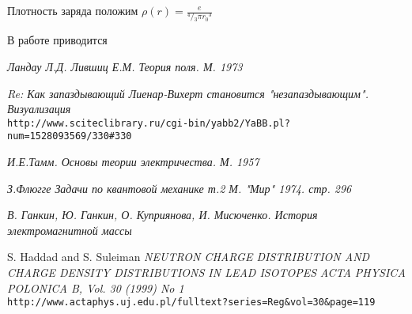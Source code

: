 \documentclass{article}
\begin{document}
Плотность заряда положим $\rho \left( r \right)=\frac{e}{{}^{4}/{}_{3}\pi {{r}_{0}}^{3}}$

В работе \cite{misyuchenko} приводится


\begin{thebibliography}{99}

\textit{Ландау Л.Д. Лившиц Е.М. Теория поля. М. 1973}

\textit{Re: Как запаздывающий Лиенар-Вихерт становится "незапаздывающим". Визуализация}
\\\texttt{http://www.sciteclibrary.ru/cgi-bin/yabb2/YaBB.pl?num=1528093569/330\#330}

\textit{И.Е.Тамм. Основы теории электричества. М. 1957}

\textit{З.Флюгге Задачи по квантовой механике т.2 М. "Мир" 1974. стр. 296}

\textit{В. Ганкин, Ю. Ганкин, О. Куприянова, И. Мисюченко. История электромагнитной массы}


S. Haddad and S. Suleiman
\textit{NEUTRON CHARGE DISTRIBUTION AND CHARGE DENSITY DISTRIBUTIONS IN LEAD ISOTOPES}
\textit{ACTA PHYSICA POLONICA B, Vol. 30 (1999) No 1}
\\\texttt{http://www.actaphys.uj.edu.pl/fulltext?series=Reg\&vol=30\&page=119}



\end{thebibliography}
\end{document}
